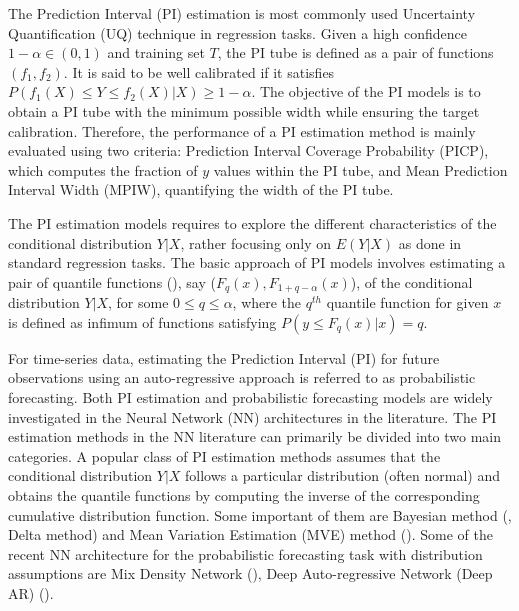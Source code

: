\documentclass[10pt]{article} %
\begin{document}
 The Prediction Interval (PI) estimation is most commonly used Uncertainty Quantification (UQ) technique in regression tasks. Given a high confidence $1-\alpha \in (0,1)$ and training set $T$, the PI  tube is defined as a pair of functions $(f_1,f_2)$. It is said to be well calibrated if it satisfies $P(f_1(X)\leq Y \leq f_2(X)|X) \geq 1-\alpha$. The objective of the PI models is to obtain a PI tube with the minimum possible width while ensuring the target calibration. Therefore, the performance of a PI estimation method is mainly evaluated using two criteria: Prediction Interval Coverage Probability (PICP), which computes the fraction of $y$ values within the PI tube, and Mean Prediction Interval Width (MPIW), quantifying the width of the PI tube.


The  PI estimation models requires to explore the different  characteristics of the conditional distribution $Y|X$, rather focusing only on $E(Y|X)$ as done in standard regression tasks.  The basic approach of PI models involves estimating a pair of quantile functions (\cite{koenker1978regression}), say ($F_{q}(x),F_{1+q-\alpha}(x)$), of the  conditional distribution $Y|X$, for some $0 \leq q \leq \alpha$, where the $q^{th}$ quantile function for given $x$ is defined as infimum of functions satisfying $P(y\leq F_q(x)|x) = q$.  

For time-series data, estimating the Prediction Interval (PI) for future observations using an auto-regressive approach is referred to as probabilistic forecasting.
 Both PI estimation and probabilistic forecasting models are widely investigated in the Neural Network (NN) architectures in the literature. The PI estimation methods in the NN literature can primarily be divided into two main categories. A popular class of PI estimation methods assumes that the conditional distribution $Y|X$ follows a particular distribution (often normal) and obtains the quantile functions by computing the inverse of the  corresponding cumulative distribution function. Some important of them are Bayesian method (\cite{mackay1992evidence, bishop1995neural}, Delta method\cite{de1998prediction,hwang1997prediction,seber2015nonlinear}) and Mean Variation Estimation (MVE) method (\cite{nix1994estimating}). Some of the recent NN architecture for the probabilistic forecasting task with distribution assumptions are Mix Density Network (\cite{bishop1994mixture,zhang2020improved}), Deep Auto-regressive Network (Deep AR) (\cite{salinas2020deepar}).  
\end{document}

